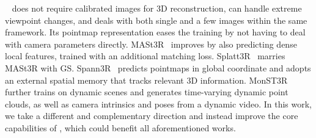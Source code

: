  \duster{}~\cite{wang2024dust3r} does not require calibrated images for 3D reconstruction, can handle extreme viewpoint changes, and deals with both single and a few images within the same framework.
Its pointmap representation eases the training by not having to deal with camera parameters directly.
MASt3R~\cite{leroy2024mast3r} improves \duster{} by also predicting dense local features, trained with an additional matching loss.
Splatt3R~\cite{smart2024splatt3r} marries MASt3R with GS. %
Spann3R~\cite{wang2024spann3r} predicts pointmaps in global coordinate and  adopts an external spatial memory that tracks relevant 3D information.
MonST3R~\cite{zhang2024monst3r} further trains  \duster{} on dynamic scenes and generates time-varying dynamic point clouds, as well as camera intrinsics and poses from a dynamic video.
In this work, we take a different and complementary direction and instead improve the core capabilities of \duster{}, which could benefit all aforementioned works.

